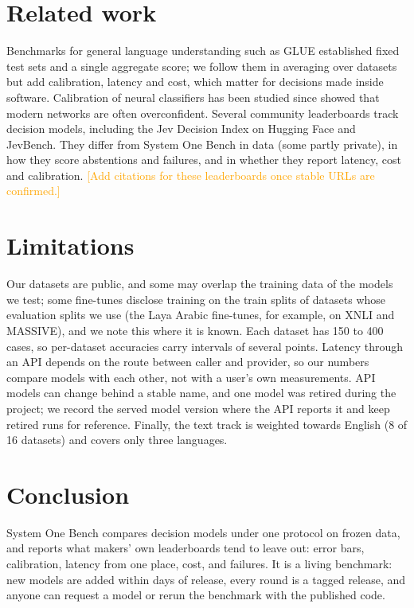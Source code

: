 \documentclass[11pt]{article}
\newcommand{\draftnote}[1]{\textcolor{orange}{[#1]}}
\begin{document}
\section{Related work}

Benchmarks for general language understanding such as GLUE \citep{wang2018glue} established fixed test sets and a
single aggregate score; we follow them in averaging over datasets but add calibration, latency and cost, which matter
for decisions made inside software. Calibration of neural classifiers has been studied since \citet{guo2017calibration}
showed that modern networks are often overconfident. Several community leaderboards track decision models, including
the Jev Decision Index on Hugging Face and JevBench. They differ from System One Bench in data (some partly private),
in how they score abstentions and failures, and in whether they report latency, cost and calibration.
\draftnote{Add citations for these leaderboards once stable URLs are confirmed.}

\section{Limitations}

Our datasets are public, and some may overlap the training data of the models we test; some fine-tunes disclose
training on the train splits of datasets whose evaluation splits we use (the Laya Arabic fine-tunes, for example, on
XNLI and MASSIVE), and we note this where it is known. Each dataset has 150 to
400 cases, so per-dataset accuracies carry intervals of several points. Latency through an API depends on the route
between caller and provider, so our numbers compare models with each other, not with a user's own measurements. API
models can change behind a stable name, and one model was retired during the project; we record the served model
version where the API reports it and keep retired runs for reference. Finally, the text track
is weighted towards English (8 of 16 datasets) and covers only three languages.

\section{Conclusion}

System One Bench compares decision models under one protocol on frozen data, and reports what makers' own
leaderboards tend to leave out: error bars, calibration, latency from one place, cost, and failures. It is a living
benchmark: new models are added within days of release, every round is a tagged release, and anyone can request a
model or rerun the benchmark with the published code.



\end{document}
